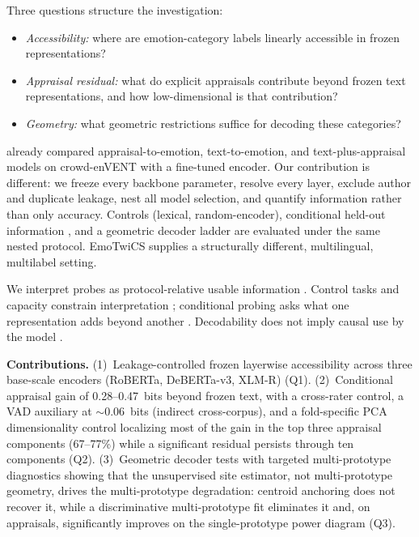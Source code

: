 \documentclass[11pt]{article}
\begin{document}
Three questions structure the investigation:
\begin{itemize}
\item[\emph{Q1.}] \emph{Accessibility:} where are emotion-category labels linearly accessible in frozen representations?
\item[\emph{Q2.}] \emph{Appraisal residual:} what do explicit appraisals contribute beyond frozen text representations, and how low-dimensional is that contribution?
\item[\emph{Q3.}] \emph{Geometry:} what geometric restrictions suffice for decoding these categories?
\end{itemize}

\citet{troiano-etal-2023-dimensional} already compared appraisal-to-emotion, text-to-emotion, and text-plus-appraisal models on crowd-enVENT with a fine-tuned encoder. Our contribution is different: we freeze every backbone parameter, resolve every layer, exclude author and duplicate leakage, nest all model selection, and quantify information rather than only accuracy. Controls (lexical, random-encoder), conditional held-out information \citep{hewitt-etal-2021-conditional}, and a geometric decoder ladder are evaluated under the same nested protocol. EmoTwiCS \citep{labat-etal-2024-emotwics,labat-etal-2022-emotional} supplies a structurally different, multilingual, multilabel setting.

We interpret probes as protocol-relative usable information \citep{xu2020theory}. Control tasks and capacity constrain interpretation \citep{hewitt-liang-2019-designing,pimentel-etal-2020-information,pimentel-etal-2020-pareto}; conditional probing asks what one representation adds beyond another \citep{hewitt-etal-2021-conditional}. Decodability does not imply causal use by the model \citep{ravichander-etal-2021-probing}.

\textbf{Contributions.} (1)~Leakage-controlled frozen layerwise accessibility across three base-scale encoders (RoBERTa, DeBERTa-v3, XLM-R) (Q1). (2)~Conditional appraisal gain of 0.28--0.47~bits beyond frozen text, with a cross-rater control, a VAD auxiliary at $\sim$0.06~bits (indirect cross-corpus), and a fold-specific PCA dimensionality control localizing most of the gain in the top three appraisal components (67--77\%) while a significant residual persists through ten components (Q2). (3)~Geometric decoder tests with targeted multi-prototype diagnostics showing that the unsupervised site estimator, not multi-prototype geometry, drives the multi-prototype degradation: centroid anchoring does not recover it, while a discriminative multi-prototype fit eliminates it and, on appraisals, significantly improves on the single-prototype power diagram (Q3).
\end{document}
